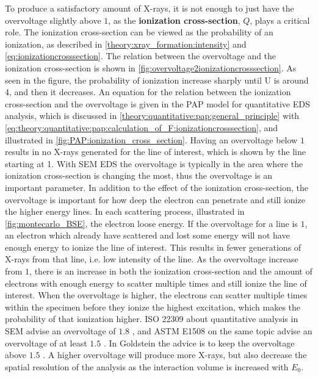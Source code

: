 To produce a satisfactory amount of X-rays, it is not enough to just have the overvoltage slightly above $1$, as the \textbf{ionization cross-section}, $Q$, plays a critical role.
The ionization cross-section can be viewed as the probability of an ionization, as described in \cref{theory:xray_formation:intensity} and \cref{eq:ionizationcrosssection}.
The relation between the overvoltage and the ionization cross-section is shown in \cref{fig:overvoltage2ionizationcrosssection}.
As seen in the figure, the probability of ionization increase sharply until U is around 4, and then it decreases.
An equation for the relation between the ionization cross-section and the overvoltage is given in the PAP model for quantitative EDS analysis, which is discussed in \cref{theory:quantitative:pap:general_principle} with \cref{eq:theory:quantitative:pap:calculation_of_F:ionizationcrosssection}, and illustrated in \cref{fig:PAP:ionization_cross_section}.
Having an overvoltage below $1$ results in no X-rays generated for the line of interest, which is shown by the line starting at 1.
With SEM EDS the overvoltage is typically in the area where the ionization cross-section is changing the most, thus the overvoltage is an important parameter.
In addition to the effect of the ionization cross-section, the overvoltage is important for how deep the electron can penetrate and still ionize the higher energy lines.
In each scattering process, illustrated in \cref{fig:montecarlo_BSE}, the electron loose energy.
If the overvoltage for a line is $1$, an electron which already have scattered and lost some energy will not have enough energy to ionize the line of interest.
This results in fewer generations of X-rays from that line, i.e. low intensity of the line.
As the overvoltage increase from $1$, there is an increase in both the ionization cross-section and the amount of electrons with enough energy to scatter multiple times and still ionize the line of interest.
When the overvoltage is higher, the electrons can scatter multiple times within the specimen before they ionize the highest excitation, which makes the probability of that ionization higher.
ISO 22309 about quantitative analysis in SEM advise an overvoltage of $1.8$ \cite{iso_emsa_22029}, and ASTM E1508 on the same topic advise an overvoltage of at least $1.5$ \cite{astm_e1508_eds_quantification}.
In Goldstein the advice is to keep the overvoltage above $1.5$ \cite[Ch. 20.2.2]{goldstein_scanning_2018}.
A higher overvoltage will produce more X-rays, but also decrease the spatial resolution of the analysis as the interaction volume is increased with $E_0$. %


